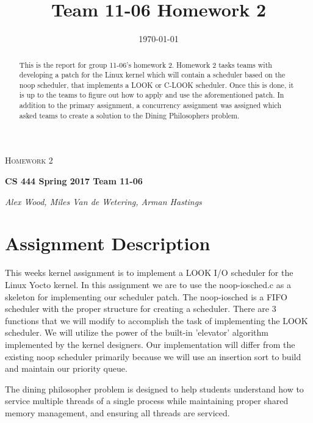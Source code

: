 \documentclass[letterpaper,10pt,draftclsnofoot,onecolumn]{IEEEtran}
\title{Team 11-06 Homework 2}
\def\name{Alex Wood, Miles Van de Wetering, Arman Hastings}
\begin{document}
\begin{titlepage}
   \centering
	{\scshape\Large Homework 2\par}
	\vspace{1.5cm}
	{\huge\bfseries CS 444 Spring 2017 Team 11-06\par}
	\vspace{2cm}
	{\Large\itshape \name \par}
    
    \date{\today}
    
    \vspace{2cm}
    
    \begin{abstract}
 	This is the report for group 11-06's homework 2. Homework 2 tasks teams with developing a patch for the Linux kernel which will contain a scheduler based on the noop scheduler, that implements a LOOK or C-LOOK scheduler. Once this is done, it is up to the teams to figure out how to apply and use the aforementioned patch. In addition to the primary assignment, a concurrency assignment was assigned which asked teams to create a solution to the Dining Philosophers problem.
   \end{abstract}
      
\end{titlepage}

\tableofcontents

\newpage

\section{Assignment Description}
This weeks kernel assignment is to implement a LOOK I/O scheduler for the Linux Yocto kernel. In this assignment we are to use the noop-iosched.c as a skeleton for implementing our scheduler patch. The noop-iosched is a FIFO scheduler with the proper structure for creating a scheduler. There are 3 functions that we will modify to accomplish the task of implementing the LOOK scheduler. We will utilize the power of the built-in 'elevator' algorithm implemented by the kernel designers. Our implementation will differ from the existing noop scheduler primarily because we will use an insertion sort to build and maintain our priority queue. 

The dining philosopher problem is designed to help students understand how to service multiple threads of a single process while maintaining proper shared memory management, and ensuring all threads are serviced.
\end{document}
